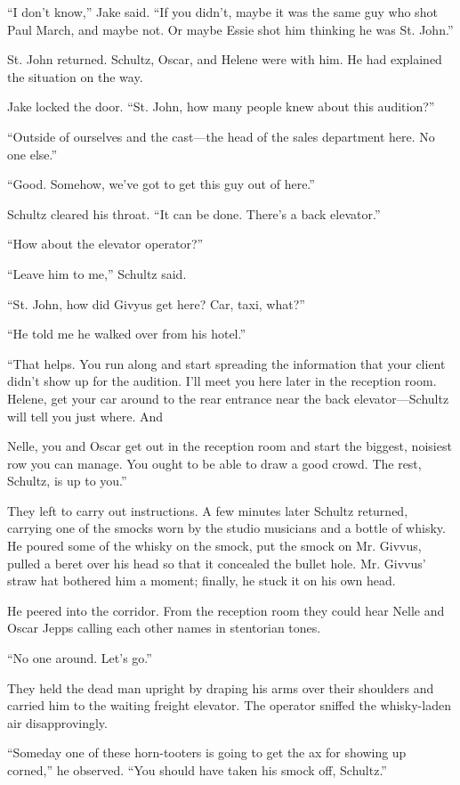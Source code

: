 \documentclass{novel}
\begin{document}
“I don’t know,” Jake said. “If you didn’t, maybe it was the same guy who shot Paul March, and maybe not. Or maybe Essie shot him thinking he was St. John.”

St. John returned. Schultz, Oscar, and Helene were with him. He had explained the situation on the way.

Jake locked the door. “St. John, how many people knew about this audition?”

“Outside of ourselves and the cast—the head of the sales department here. No one else.”

“Good. Somehow, we’ve got to get this guy out of here.”

Schultz cleared his throat. “It can be done. There’s a back elevator.”

“How about the elevator operator?”

“Leave him to me,” Schultz said.

“St. John, how did Givyus get here? Car, taxi, what?”

“He told me he walked over from his hotel.”

“That helps. You run along and start spreading the information that your client didn’t show up for the audition. I'll meet you here later in the reception room. Helene, get your car around to the rear entrance near the back elevator—Schultz will tell you just where. And

Nelle, you and Oscar get out in the reception room and start the biggest, noisiest row you can manage. You ought to be able to draw a good crowd. The rest, Schultz, is up to you.”

They left to carry out instructions. A few minutes later Schultz returned, carrying one of the smocks worn by the studio musicians and a bottle of whisky. He poured some of the whisky on the smock, put the smock on Mr. Givvus, pulled a beret over his head so that it concealed the bullet hole. Mr. Givvus’ straw hat bothered him a moment; finally, he stuck it on his own head.

He peered into the corridor. From the reception room they could hear Nelle and Oscar Jepps calling each other names in stentorian tones.

“No one around. Let’s go.”

They held the dead man upright by draping his arms over their shoulders and carried him to the waiting freight elevator. The operator sniffed the whisky-laden air disapprovingly.

“Someday one of these horn-tooters is going to get the ax for showing up corned,” he observed. “You should have taken his smock off, Schultz.”
\end{document}
